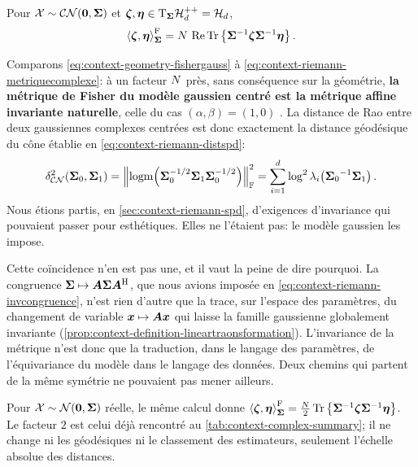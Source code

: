 \begin{property}
\label{prop:context-geometry-fishergauss}
  Pour $\mathcal{X}\sim\mathcal{CN}(\boldsymbol{0},\boldsymbol{\Sigma})$ et $\boldsymbol{\zeta},\boldsymbol{\eta}\in\mathrm{T}_{\boldsymbol{\Sigma}}\mathcal{H}_{d}^{++}=\mathcal{H}_{d}$,
  \begin{equation}
    \left\langle \boldsymbol{\zeta}, \boldsymbol{\eta} \right\rangle_{\boldsymbol{\Sigma}}^{\mathrm{F}}
    =
    N\,\operatorname{\operatorname{Re}}\operatorname{\operatorname{Tr}}\left\{{\boldsymbol{\Sigma}}^{-1}\boldsymbol{\zeta}{\boldsymbol{\Sigma}}^{-1}\boldsymbol{\eta}\right\}.
    \label{eq:context-geometry-fishergauss}
  \end{equation}
\end{property}

\begin{remark}
\label{rem:context-geometry-rencontre}
  Comparons \cref{eq:context-geometry-fishergauss} à \cref{eq:context-riemann-metriquecomplexe}: à un facteur $N$ près, sans conséquence sur la géométrie, \textbf{la métrique de Fisher du modèle gaussien centré est la métrique affine invariante naturelle}, celle du cas $(\alpha,\beta)=(1,0)$ . La distance de Rao entre deux gaussiennes complexes centrées est donc exactement la distance géodésique du cône établie en \cref{eq:context-riemann-distspd}:
  \begin{equation}
    \delta_{\mathcal{CN}}^2(\boldsymbol{\Sigma}_0,\boldsymbol{\Sigma}_1)
    =
    \left\lVert\operatorname{\operatorname{logm}}\!\left(\boldsymbol{\Sigma}_0^{-1/2}\boldsymbol{\Sigma}_1\boldsymbol{\Sigma}_0^{-1/2}\right)\right\rVert_{\mathbb{F}}^2
    =
    \sum_{i=1}^{d}\log^2\lambda_i\!\left({\boldsymbol{\Sigma}_0}^{-1}\boldsymbol{\Sigma}_1\right).
    \label{eq:context-geometry-raogauss}
  \end{equation}
  Nous étions partis, en \cref{sec:context-riemann-spd}, d'exigences d'invariance qui pouvaient passer pour esthétiques. Elles ne l'étaient pas: le modèle gaussien les impose.
\end{remark}

Cette coïncidence n'en est pas une, et il vaut la peine de dire pourquoi. La congruence $\boldsymbol{\Sigma}\mapsto\boldsymbol{A}\boldsymbol{\Sigma}\boldsymbol{A}^{\mathrm{H}}$, que nous avions imposée en \cref{eq:context-riemann-invcongruence}, n'est rien d'autre que la trace, sur l'espace des paramètres, du changement de variable $\boldsymbol{x}\mapsto\boldsymbol{A}\boldsymbol{x}$ qui laisse la famille gaussienne globalement invariante (\cref{prop:context-definition-lineartraonsformation}). L'invariance de la métrique n'est donc que la traduction, dans le langage des paramètres, de l'équivariance du modèle dans le langage des données. Deux chemins qui partent de la même symétrie ne pouvaient pas mener ailleurs.

\begin{remark}
  Pour $\mathcal{X}\sim\mathcal{N}(\boldsymbol{0},\boldsymbol{\Sigma})$ réelle, le même calcul donne $\left\langle \boldsymbol{\zeta}, \boldsymbol{\eta} \right\rangle_{\boldsymbol{\Sigma}}^{\mathrm{F}}=\tfrac{N}{2}\operatorname{\operatorname{Tr}}\left\{{\boldsymbol{\Sigma}}^{-1}\boldsymbol{\zeta}{\boldsymbol{\Sigma}}^{-1}\boldsymbol{\eta}\right\}$. Le facteur $2$ est celui déjà rencontré au \cref{tab:context-complex-summary}; il ne change ni les géodésiques ni le classement des estimateurs, seulement l'échelle absolue des distances.
\end{remark}

